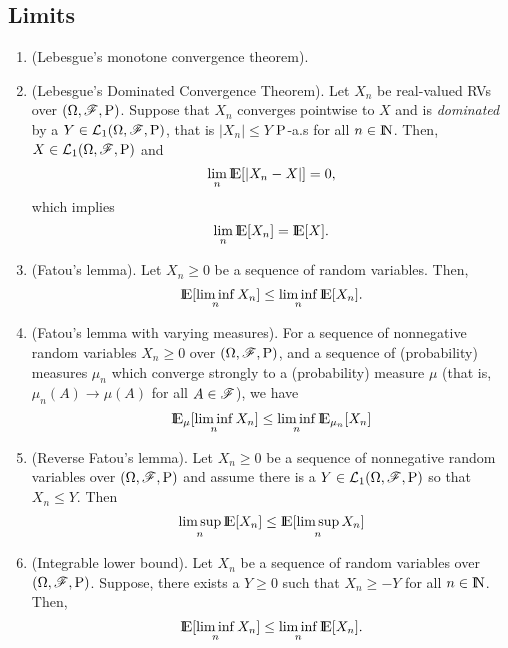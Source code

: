 \documentclass[a4paper,10pt]{article}
\begin{document}
\subsection{Limits}
\begin{enumerate}
 \item (Lebesgue's monotone convergence theorem).
      
 \item 	(Lebesgue's Dominated Convergence Theorem). Let $X_n$ be real-valued RVs over $(\Omega,\mathscr{F},\mathrm{P})$. 
	Suppose that $X_n$ converges pointwise to $X$ and is \textit{dominated} by a 
	$Y\in\mathcal{L}_1(\Omega,\mathscr{F},\mathrm{P})$, that is $|X_n|\leq Y$ $\mathrm{P}$-a.s for all $n\in\N$. 
	Then, $X\in\mathcal{L}_1(\Omega,\mathscr{F},\mathrm{P})$
	and
	\[
	 \lim_n \E[|X_n-X|] = 0,
	\]
        which implies
        \[
         \lim_n \E[X_n] = \E[X].
        \]

 \item 	(Fatou's lemma). Let $X_n\geq 0$ be a sequence of random variables. 
	Then, 
	\[
	\E[\liminf_n X_n] \leq  \liminf_n \E[X_n].
	\]
 \item 	(Fatou's lemma with varying measures). For a sequence of nonnegative random variables $X_n\geq 0$ over $(\Omega,\mathscr{F},\mathrm{P})$,
	and a sequence of (probability) measures $\mu_n$ which converge strongly to a (probability)
	measure $\mu$ (that is, $\mu_n(A)\to\mu(A)$ for all $A\in\mathscr{F}$), we have
	\[
	 \E_\mu[\liminf_n X_n]\leq \liminf_n \E_{\mu_n}[ X_n]
	\]

 \item 	(Reverse Fatou's lemma). Let $X_n\geq 0$ be a sequence of nonnegative random variables over $(\Omega,\mathscr{F},\mathrm{P})$ and
	assume there is a $Y\in\mathcal{L}_1(\Omega,\mathscr{F},\mathrm{P})$ so that $X_n\leq Y$. Then
	\[ 
	 \limsup_n \E[X_n] \leq \E[\limsup_n X_n]
	\]
 \item (Integrable lower bound). 	
	Let $X_n$ be a sequence of random variables over $(\Omega,\mathscr{F},\mathrm{P})$. Suppose, there exists a
	$Y\geq 0$ such that $X_n\geq -Y$ for all $n\in\N$. Then,
	\[
	\E[\liminf_n X_n] \leq  \liminf_n \E[X_n].
	\]
\end{enumerate}
\end{document}
